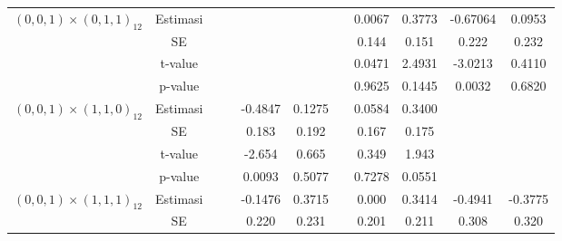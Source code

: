 \begin{enumerate}[label=\alph*.]
\begin{longtable}{|c|c|c|c|c|c|c|c|c|c|c|}
            \multirow{4}{*}{$(0,0,1)\times(0,1,1)_{12}$}
            & Estimasi
            & {} & {}
            & {} & {} & {}
            & {0.0067} & {0.3773}
            & {-0.67064} & {0.0953} \\ \cline{2-11}

            & SE
            & {} & {}
            & {} & {} & {}
            & {0.144} & {0.151}
            & {0.222} & {0.232} \\ \cline{2-11}

            & t-value
            & {} & {}
            & {} & {} & {}
            & {0.0471} & {2.4931}
            & {-3.0213} & {0.4110} \\ \cline{2-11}

            & p-value
            & {} & {}
            & {} & {} & {}
            & {0.9625} & {0.1445}
            & {0.0032} & {0.6820} \\ \hline

            \multirow{4}{*}{$(0,0,1)\times(1,1,0)_{12}$}
            & Estimasi
            & {} & {}
            & {-0.4847} & {0.1275} & {}
            & {0.0584} & {0.3400}
            & {} & {} \\ \cline{2-11}

            & SE
            & {} & {}
            & {0.183} & {0.192} & {}
            & {0.167} & {0.175}
            & {} & {} \\ \cline{2-11}

            & t-value
            & {} & {}
            & {-2.654} & {0.665} & {}
            & {0.349} & {1.943}
            & {} & {} \\ \cline{2-11}

            & p-value
            & {} & {}
            & {0.0093} & {0.5077} & {}
            & {0.7278} & {0.0551}
            & {} & {} \\ \hline

            \multirow{4}{*}{$(0,0,1)\times(1,1,1)_{12}$}
            & Estimasi
            & {} & {}
            & {-0.1476} & {0.3715} & {}
            & {0.000} & {0.3414}
            & {-0.4941} & {-0.3775} \\ \cline{2-11}

            & SE
            & {} & {}
            & {0.220} & {0.231} & {}
            & {0.201} & {0.211}
            & {0.308} & {0.320} \\ \cline{2-11}


\end{longtable}
\end{enumerate}

